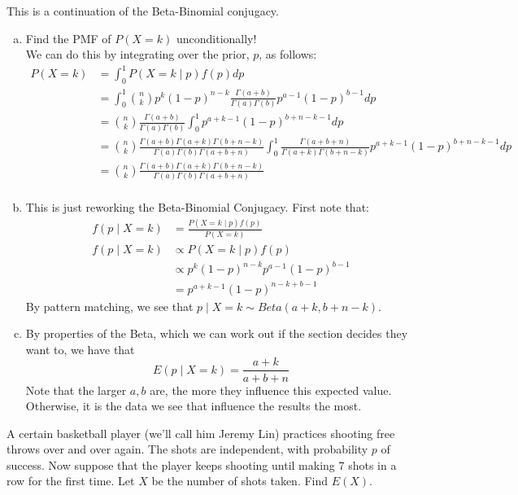 \documentclass[11pt]{article}
\begin{document}
\begin{solution}
This is a continuation of the Beta-Binomial conjugacy.
\begin{enumerate}[a)]
\item Find the PMF of $P(X = k)$ unconditionally! \\
We can do this by integrating over the prior, $p$, as follows:
\begin{align}
P(X = k) &= \int_0^1 P(X = k \mid p)f(p) dp \\
&= \int_0^1 {n \choose k} p^k(1-p)^{n-k} \frac{\Gamma(a+b) }{\Gamma(a)\Gamma(b)}p^{a - 1}(1-p)^{b-1} dp \\
&= {n \choose k} \frac{\Gamma(a + b)}{\Gamma(a)\Gamma(b)} \int_{0}^1 p^{a+k - 1}(1-p)^{b + n -k - 1} dp \\
&= {n \choose k} \frac{\Gamma(a + b)\Gamma(a+k)\Gamma(b+n-k)}{\Gamma(a)\Gamma(b)\Gamma(a + b + n)} \int_{0}^1  \frac{\Gamma(a + b + n)}{\Gamma(a+k)\Gamma(b+n-k)} p^{a+k - 1}(1-p)^{b + n -k - 1} dp \\
&= {n \choose k} \frac{\Gamma(a + b)\Gamma(a+k)\Gamma(b+n-k)}{\Gamma(a)\Gamma(b)\Gamma(a + b + n)} \\
\end{align}
\item This is just reworking the Beta-Binomial Conjugacy. First note that:
\begin{align*}
f(p \mid X = k) &= \frac{P(X=k \mid p) f(p)}{P(X = k)} \\
f(p \mid X = k) &\propto P(X=k \mid p) f(p) \\
&\propto p^k(1-p)^{n-k}p^{a - 1}(1-p)^{b-1} \\
&= p^{a + k -1}(1-p)^{n - k + b -1}
\end{align*}
By pattern matching, we see that $p \mid X = k \sim Beta(a + k, b + n - k)$.
\item By properties of the Beta, which we can work out if the section decides they want to, we have that
$$
E(p \mid X = k) = \frac{a + k}{a + b + n}
$$
Note that the larger $a,b$ are, the more they influence this expected value. Otherwise, it is the data we see that influence the results the most.
\end{enumerate}
\end{solution}

\begin{exercise}
A certain basketball player (we'll call him Jeremy Lin) practices shooting free throws over and over again. The shots are independent, with probability $p$ of success. Now suppose that the player keeps shooting until making 7 shots in a row for the first time. Let $X$ be the number of shots taken. Find $E(X)$.
\end{exercise}
\end{document}
